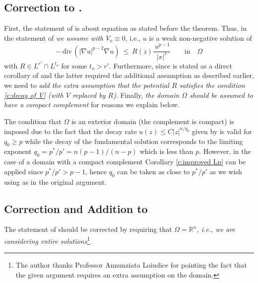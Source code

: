 \documentclass[10pt]{amsart}
\begin{document}
\subsection{Correction to \cite[Theorem 2.10]{V11}.} First, the statement of \cite[Theorem 2.10]{V11} is about equation \cite[(2.5)]{V11} as stated before the theorem. Thus, in the statement of \cite[Theorem 2.10]{V11} \emph{we assume \cite[(2.24)]{V11} with $V_o\equiv 0$}, i.e.,  $u$ is a weak non-negative solution of
\begin{equation}\label{e:eq in theorem 2.10}
 -\ \text{div}\, (|{\nabla}u|^{p-2}{\nabla}u)\ \leq \  R(z)\frac {\
u^{p-1}}{|x|^s} \qquad \text{in} \quad \Omega
 \end{equation}
with $R\in L^{r'}\cap L^{t_o}$ for some $t_o>r'$. Furthermore, since \cite[Theorem 2.10]{V11} is stated as a direct corollary of  \cite[Theorem 2.1, Theorem 2.5 and Theorem 2.9]{V11} and the latter required the additional assumption as described earlier, we need to \emph{add the extra assumption that the potential $R$ satisfies the condition \eqref{e:decay of V} (with $V$ replaced by $R$)}. Finally, \emph{the domain $\Omega$ should be assumed to have a compact complement} for reasons we explain below.


The condition that $\Omega$ is an exterior domain (the complement is compact) is imposed due to the fact that the decay rate  $u(z)\leq C |z|^{n/q_0}$ given by \cite[Theorem 2.9]{V11} is valid for $q_0\geq p$ while the decay of the fundamental solution corresponds to  the limiting exponent $q_0=p^*/p'=n(p-1)/(n-p)$ which is less than $p$. However, in the case of a domain with a compact complement Corollary \ref{c:improved Lp} can be applied since $p^*/p'>p-1$, hence  $q_0$ can be taken as close to $p^*/p'$ as we wish using \cite[Theorem 2.5]{V11} as in the original argument.



\subsection{Correction and Addition to \cite[Section 3]{V11}}
The statement of \cite[Theorem 3.1]{V11} should be corrected by requiring that\emph{ $\Omega=\mathbb{R}^n$, i.e., we are considering entire solutions}\footnote{The author thanks Professor Annunziata Loiudice for pointing  the fact that the given argument requires an extra assumption on the domain.}.
\end{document}
